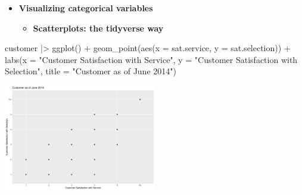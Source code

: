 \documentclass[
  ignorenonframetext,
]{beamer}
\newenvironment{Shaded}{\begin{snugshade}}{\end{snugshade}}
\newcommand{\AttributeTok}[1]{\textcolor[rgb]{0.40,0.45,0.13}{#1}}
\newcommand{\FunctionTok}[1]{\textcolor[rgb]{0.28,0.35,0.67}{#1}}
\newcommand{\NormalTok}[1]{\textcolor[rgb]{0.00,0.23,0.31}{#1}}
\newcommand{\SpecialCharTok}[1]{\textcolor[rgb]{0.37,0.37,0.37}{#1}}
\newcommand{\StringTok}[1]{\textcolor[rgb]{0.13,0.47,0.30}{#1}}
\providecommand{\tightlist}{%
  \setlength{\itemsep}{0pt}\setlength{\parskip}{0pt}}\usepackage{longtable,booktabs,array}
\begin{document}
\begin{frame}[fragile]{}
\label{section-26}
\begin{itemize}
\item
  \textbf{Visualizing categorical variables}

  \begin{itemize}
  \tightlist
  \item
    \textbf{Scatterplots: the tidyverse way}
  \end{itemize}
\end{itemize}

\tiny

\begin{Shaded}
\begin{Highlighting}[]
\NormalTok{customer }\SpecialCharTok{|\textgreater{}} 
  \FunctionTok{ggplot}\NormalTok{() }\SpecialCharTok{+}
  \FunctionTok{geom\_point}\NormalTok{(}\FunctionTok{aes}\NormalTok{(}\AttributeTok{x =}\NormalTok{ sat.service, }\AttributeTok{y =}\NormalTok{ sat.selection)) }\SpecialCharTok{+}
  \FunctionTok{labs}\NormalTok{(}\AttributeTok{x =} \StringTok{"Customer Satisfaction with Service"}\NormalTok{,}
       \AttributeTok{y =} \StringTok{"Customer Satisfaction with Selection"}\NormalTok{,}
       \AttributeTok{title =} \StringTok{"Customer as of June 2014"}\NormalTok{)}
\end{Highlighting}
\end{Shaded}

\begin{center}
\includegraphics[width=0.5\textwidth,height=\textheight]{004_relationships_between_continuous_variables_files/figure-beamer/unnamed-chunk-26-1.pdf}
\end{center}
\end{frame}
\end{document}
